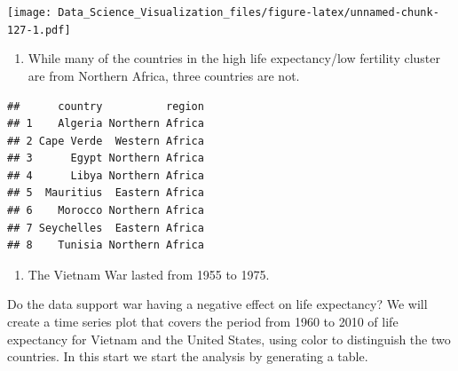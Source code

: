 \documentclass[
]{article}
\newenvironment{Shaded}{\begin{snugshade}}{\end{snugshade}}
\newcommand{\DecValTok}[1]{\textcolor[rgb]{0.00,0.00,0.81}{#1}}
\newcommand{\KeywordTok}[1]{\textcolor[rgb]{0.13,0.29,0.53}{\textbf{#1}}}
\newcommand{\NormalTok}[1]{#1}
\newcommand{\OperatorTok}[1]{\textcolor[rgb]{0.81,0.36,0.00}{\textbf{#1}}}
\newcommand{\StringTok}[1]{\textcolor[rgb]{0.31,0.60,0.02}{#1}}
\providecommand{\tightlist}{%
  \setlength{\itemsep}{0pt}\setlength{\parskip}{0pt}}
\begin{document}
\texttt{[image: Data\_Science\_Visualization\_files/figure-latex/unnamed-chunk-127-1.pdf]}

\begin{enumerate}
\def\labelenumi{\arabic{enumi}.}
\setcounter{enumi}{2}
\tightlist
\item
  While many of the countries in the high life expectancy/low fertility
  cluster are from Northern Africa, three countries are not.
\end{enumerate}

\begin{Shaded}
\end{Shaded}

\begin{verbatim}
##      country          region
## 1    Algeria Northern Africa
## 2 Cape Verde  Western Africa
## 3      Egypt Northern Africa
## 4      Libya Northern Africa
## 5  Mauritius  Eastern Africa
## 6    Morocco Northern Africa
## 7 Seychelles  Eastern Africa
## 8    Tunisia Northern Africa
\end{verbatim}

\begin{enumerate}
\def\labelenumi{\arabic{enumi}.}
\setcounter{enumi}{3}
\tightlist
\item
  The Vietnam War lasted from 1955 to 1975.
\end{enumerate}

Do the data support war having a negative effect on life expectancy? We
will create a time series plot that covers the period from 1960 to 2010
of life expectancy for Vietnam and the United States, using color to
distinguish the two countries. In this start we start the analysis by
generating a table.

\begin{Shaded}
\end{Shaded}
\end{document}
